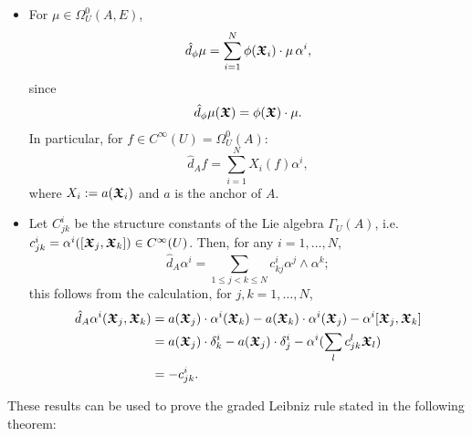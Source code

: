 \begin{itemize}
    \item For $\mu \in \Omega_U^0(A, E)$,
    \begin{equation}\label{equationDifferential0FormwrtFrame}
        \hat d_\phi \mu = \sum_{i = 1}^N \phi(\sectoid X_i)\cdot \mu \, \alpha^i,
    \end{equation}
    since
    \begin{align}\label{equationDifferentialESection0FormLocalFrame}
        \hat d_\phi \mu(\sectoid X) = \phi(\sectoid X)\cdot \mu.
    \end{align}
    In particular, for $f \in C^\infty(U) = \Omega_U^0(A)$:
    \begin{equation}\label{equationDifferentialOfAFunctionInLocalFrame}
        \hat d_A f = \sum_{i = 1}^N X_i(f) \alpha^i,
    \end{equation}
    where $X_i := a(\bm{\mathfrak{X}}_i)$ and $a$ is the anchor of $A$.
    
    \item Let $C^i_{jk}$ be the structure constants of the Lie algebra $\Gamma_U(A)$, i.e. $c^i_{jk} = \alpha^i([\bm{\mathfrak{X}}_j, \bm{\mathfrak{X}}_k]) \in C^\infty(U)$. Then, for any $i = 1, \dots, N$,
    \begin{equation}\label{equationDifferentialOfDual1FormsLocalFrame}
        \hat d_A \alpha^i = \sum_{1 \leq j < k \leq N} c^i_{k j} \alpha^j \wedge \alpha^k;
    \end{equation}
    this follows from the calculation, for $j, k = 1, \dots, N$,
    \begin{align*}
        \hat d_A \alpha^i(\bm{\mathfrak{X}}_j, \bm{\mathfrak{X}}_k) 
            &= a(\bm{\mathfrak{X}}_j)\cdot \alpha^i(\bm{\mathfrak{X}}_k) - a(\bm{\mathfrak{X}}_k)\cdot \alpha^i(\bm{\mathfrak{X}}_j) - \alpha^i[\bm{\mathfrak{X}}_j, \bm{\mathfrak{X}}_k]\\
            &= a(\bm{\mathfrak{X}}_j)\cdot \delta^i_k - a(\bm{\mathfrak{X}}_j)\cdot \delta^i_j - \alpha^i(\sum_l c^l_{jk} \bm{\mathfrak{X}}_l)\\
            &= -c^i_{jk}.
    \end{align*}
    
    \end{itemize}
These results can be used to prove the graded Leibniz rule stated in the following theorem:

